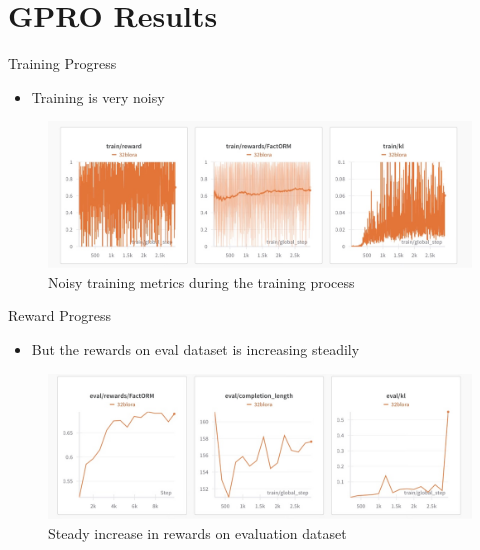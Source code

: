 \documentclass[aspectratio=169]{beamer}
\begin{document}
\section{GPRO Results}
\begin{frame}{Training Progress}
    \begin{itemize}
        \item Training is very noisy
    \end{itemize}
    
    \begin{figure}
        \includegraphics[width=\columnwidth,height=0.65\textheight,keepaspectratio]{images/image2.png}
        \caption{Noisy training metrics during the training process}
    \end{figure}
\end{frame}

\begin{frame}{Reward Progress}
    \begin{itemize}
        \item But the rewards on eval dataset is increasing steadily
    \end{itemize}
    
    \begin{figure}
        \includegraphics[width=\columnwidth,height=0.65\textheight,keepaspectratio]{images/image3.png}
        \caption{Steady increase in rewards on evaluation dataset}
    \end{figure}
\end{frame}
\end{document}

